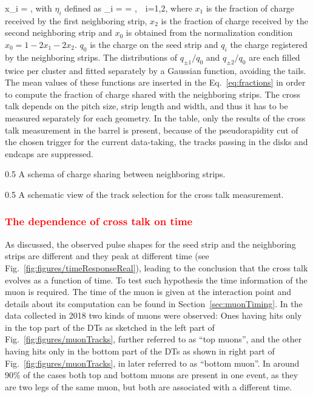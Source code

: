 {
x_{i} =  ,
}
with $\eta_{i}$ defined as
{
\eta_{\pm i} =  =  ,~~i=1,2,
}
where $x_{1}$ is the fraction of charge received by the first neighboring strip,  $x_{2}$ is the fraction of charge received by the second neighboring strip and $x_{0}$ is obtained from the normalization condition $x_{0} = 1-2x_{1}-2x_{2}$. $q_{0}$ is the charge on the seed strip and $q_{i}$ the charge registered by the neighboring strips. The distributions of $q_{\pm 1}/q_{0}$ and $q_{\pm 2}/q_{0}$ are each filled twice per cluster and fitted separately by a Gaussian function, avoiding the tails. The mean values of these functions are inserted in the Eq.~\ref{eq:fractions} in order to compute the fraction of charge shared with the neighboring strips. The cross talk depends on the pitch size, strip length and width, and thus it has to be measured separately for each geometry. In the table, only the results of the cross talk measurement in the barrel is present, because of the pseudorapidity cut of the chosen trigger for the current data-taking, the tracks passing in the disks and endcaps are suppressed. 

                 {0.5}       %
                 { A schema of charge sharing between neighboring strips. }

                 {0.5}       %
                 { A schematic view of the track selection for the cross talk measurement. }

\subsubsection{\textcolor{red}{The dependence of cross talk on time}}

As discussed, the observed pulse shapes for the seed strip and the neighboring strips are different and they peak at different time (see Fig.~\ref{fig:figures/timeResponseReal}), leading to the conclusion that the cross talk evolves as a function of time. To test such hypothesis the time information of the muon is required. The time of the muon is given at the interaction point and details about its computation can be found in Section~\ref{sec:muonTiming}. In the data collected in 2018 two kinds of muons were observed: Ones having hits only in the top part of the DTs as sketched in the left part of Fig.~\ref{fig:figures/muonTracks}, further referred to as ``top muons'',  and the other having hits only in the bottom part of the DTs as shown in right part of Fig.~\ref{fig:figures/muonTracks}, in later referred to as ``bottom muon''. In around 90\% of the cases both top and bottom muons are present in one event, as they are two legs of the same muon, but both are associated with a different time. 

